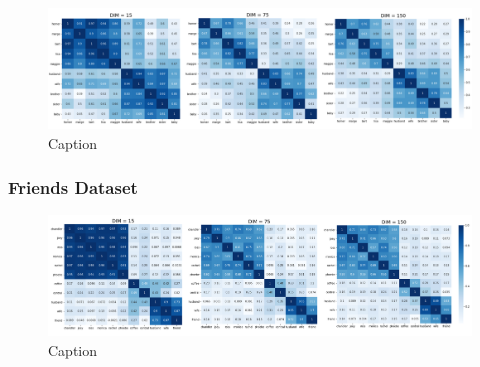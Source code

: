 \begin{figure}[H]
    \centering
    \includegraphics[width=\textwidth]{doc/images/simpsons_sim_matrix.png}
    \caption{Caption}
    \label{fig:simpsons_sim_matrix}
\end{figure}

\subsubsection{Friends Dataset}

\begin{figure}[H]
    \centering
    \includegraphics[width=\textwidth]{doc/images/friends_sim_matrix.png}
    \caption{Caption}
    \label{fig:friends_sim_matrix}
\end{figure}

\newpage